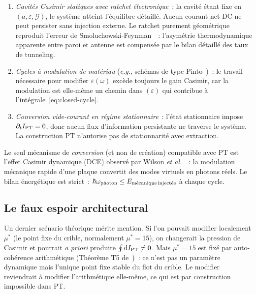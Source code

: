 \documentclass[11pt,a4paper]{article}
\newcommand{\IPT}{I_{\rm PT}}
\begin{document}
\begin{enumerate}
  \item \emph{Cavités Casimir statiques avec ratchet électronique}~: la cavité étant fixe en
  $(a, \varepsilon, \mathcal{G})$, le système atteint l'équilibre détaillé. Aucun courant net
  DC ne peut persister sans injection externe. Le ratchet purement géométrique reproduit
  l'erreur de Smoluchowski-Feynman~\cite{Feynman1963}~: l'asymétrie thermodynamique apparente
  entre paroi et antenne est compensée par le bilan détaillé des taux de tunneling.

  \item \emph{Cycles à modulation de matériau} (\emph{e.g.}, schémas de type
  Pinto~\cite{Pinto1999})~: le travail nécessaire pour modifier $\varepsilon(\omega)$
  excède toujours le gain Casimir, car la modulation est elle-même un chemin dans
  $(\varepsilon)$ qui contribue à l'intégrale~\eqref{eq:closed-cycle}.

  \item \emph{Conversion vide-courant en régime stationnaire}~: l'état stationnaire impose
  $\partial_{t} \IPT = 0$, donc aucun flux d'information persistante ne traverse le système.
  La construction PT n'autorise pas de stationnarité avec extraction.
\end{enumerate}

Le seul mécanisme de \emph{conversion} (et non de création) compatible avec PT est l'effet
Casimir dynamique (DCE) observé par Wilson \emph{et al.}~\cite{Wilson2011}~: la modulation
mécanique rapide d'une plaque convertit des modes virtuels en photons réels. Le bilan
énergétique est strict~: $\hbar\omega_{\rm photon} \leq E_{\rm m\acute{e}canique\,inject\acute{e}e}$
à chaque cycle.

\subsection{Le faux espoir architectural}

Un dernier scénario théorique mérite mention. Si l'on pouvait modifier localement $\mu^{*}$
(le point fixe du crible, normalement $\mu^{*} = 15$), on changerait la pression de Casimir et
pourrait \emph{a priori} produire $\oint \mathrm{d}\IPT \neq 0$. Mais $\mu^{*} = 15$ est fixé
par auto-cohérence arithmétique (Théorème T5 de~\cite{Senez2026})~: ce n'est pas un paramètre
dynamique mais l'unique point fixe stable du flot du crible. Le modifier reviendrait à modifier
l'arithmétique elle-même, ce qui est par construction impossible dans PT.
\end{document}
